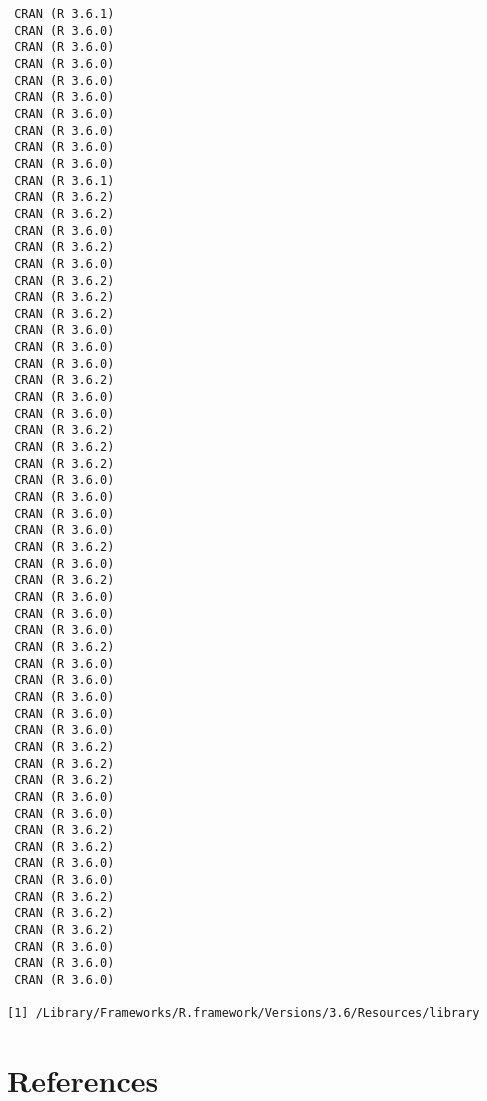 \documentclass [11pt, proquest] {uwthesis}[2015/03/03]
\begin{document}
\begin{verbatim}
 CRAN (R 3.6.1)                       
 CRAN (R 3.6.0)                       
 CRAN (R 3.6.0)                       
 CRAN (R 3.6.0)                       
 CRAN (R 3.6.0)                       
 CRAN (R 3.6.0)                       
 CRAN (R 3.6.0)                       
 CRAN (R 3.6.0)                       
 CRAN (R 3.6.0)                       
 CRAN (R 3.6.0)                       
 CRAN (R 3.6.1)                       
 CRAN (R 3.6.2)                       
 CRAN (R 3.6.2)                       
 CRAN (R 3.6.0)                       
 CRAN (R 3.6.2)                       
 CRAN (R 3.6.0)                       
 CRAN (R 3.6.2)                       
 CRAN (R 3.6.2)                       
 CRAN (R 3.6.2)                       
 CRAN (R 3.6.0)                       
 CRAN (R 3.6.0)                       
 CRAN (R 3.6.0)                       
 CRAN (R 3.6.2)                       
 CRAN (R 3.6.0)                       
 CRAN (R 3.6.0)                       
 CRAN (R 3.6.2)                       
 CRAN (R 3.6.2)                       
 CRAN (R 3.6.2)                       
 CRAN (R 3.6.0)                       
 CRAN (R 3.6.0)                       
 CRAN (R 3.6.0)                       
 CRAN (R 3.6.0)                       
 CRAN (R 3.6.2)                       
 CRAN (R 3.6.0)                       
 CRAN (R 3.6.2)                       
 CRAN (R 3.6.0)                       
 CRAN (R 3.6.0)                       
 CRAN (R 3.6.0)                       
 CRAN (R 3.6.2)                       
 CRAN (R 3.6.0)                       
 CRAN (R 3.6.0)                       
 CRAN (R 3.6.0)                       
 CRAN (R 3.6.0)                       
 CRAN (R 3.6.0)                       
 CRAN (R 3.6.2)                       
 CRAN (R 3.6.2)                       
 CRAN (R 3.6.2)                       
 CRAN (R 3.6.0)                       
 CRAN (R 3.6.0)                       
 CRAN (R 3.6.2)                       
 CRAN (R 3.6.2)                       
 CRAN (R 3.6.0)                       
 CRAN (R 3.6.0)                       
 CRAN (R 3.6.2)                       
 CRAN (R 3.6.2)                       
 CRAN (R 3.6.2)                       
 CRAN (R 3.6.0)                       
 CRAN (R 3.6.0)                       
 CRAN (R 3.6.0)                       

[1] /Library/Frameworks/R.framework/Versions/3.6/Resources/library
\end{verbatim}
\backmatter

\chapter*{References}\label{references}
\end{document}
